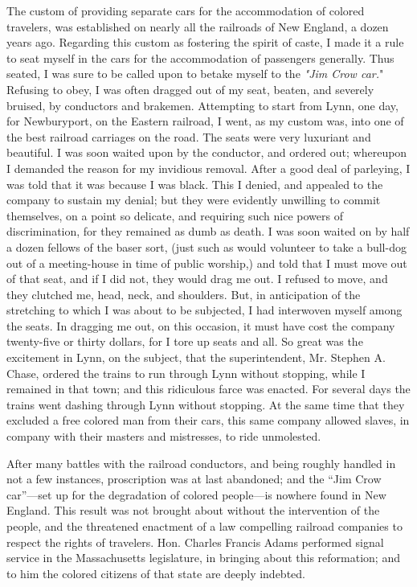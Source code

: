 The custom of providing separate cars for the accommodation of colored
travelers, was established on nearly all the railroads of New England, a
dozen years ago. Regarding this custom as fostering the spirit of caste,
I made it a rule to seat myself in the cars for the accommodation of
passengers generally. Thus seated, I was sure to be called upon to
betake myself to the \emph{"Jim Crow car.}" Refusing to obey, I was
often dragged out of my seat, beaten, and severely bruised, by
conductors and brakemen. Attempting to start from Lynn, one day, for
Newburyport, on the Eastern railroad, I went, as my custom was, into one
of the best railroad carriages on the road. The seats were very
luxuriant and beautiful. I was soon waited upon by the conductor, and
ordered out; whereupon I demanded the reason for my invidious removal.
After a good deal of parleying, I was told that it was because I was
black. This I denied, and appealed to the company to sustain my denial;
but they were evidently unwilling to commit themselves, on a point so
delicate, and requiring such nice powers of discrimination, for they
remained as dumb as death. I was soon waited on by half a dozen fellows
of the baser sort, (just such as would volunteer to take a bull-dog out
of a meeting-house in time of public worship,) and told that I must move
out of that seat, and if I did not, they would drag me out. I refused to
move, and they clutched me, head, neck, and shoulders. But, in
anticipation of the {\protect\hypertarget{400}{}{}}stretching to which I
was about to be subjected, I had interwoven myself among the seats. In
dragging me out, on this occasion, it must have cost the company
twenty-five or thirty dollars, for I tore up seats and all. So great was
the excitement in Lynn, on the subject, that the superintendent, Mr.
Stephen A. Chase, ordered the trains to run through Lynn without
stopping, while I remained in that town; and this ridiculous farce was
enacted. For several days the trains went dashing through Lynn without
stopping. At the same time that they excluded a free colored man from
their cars, this same company allowed slaves, in company with their
masters and mistresses, to ride unmolested.

After many battles with the railroad conductors, and being roughly
handled in not a few instances, proscription was at last abandoned; and
the ``Jim Crow car''---set up for the degradation of colored people---is
nowhere found in New England. This result was not brought about without
the intervention of the people, and the threatened enactment of a law
compelling railroad companies to respect the rights of travelers. Hon.
Charles Francis Adams performed signal service in the Massachusetts
legislature, in bringing about this reformation; and to him the colored
citizens of that state are deeply indebted.

